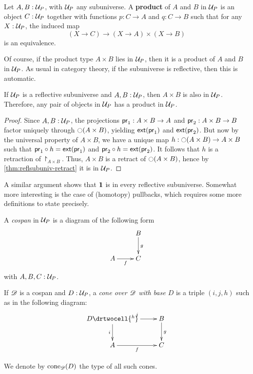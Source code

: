 \begin{defn}
  Let $A,B:\P$, with $\P$ any subuniverse.
  A \textbf{product} of $A$ and $B$ in $\P$ is an object $C:\P$ together with functions $p:C\to A$ and $q:C\to B$ such that for any $X:\P$,
the induced map
  \[ (X\to C) \to (X\to A)\times (X\to B) \]
  is an equivalence.
\end{defn}

Of course, if the product type $A\times B$ lies in $\P$, then it is a product of $A$ and $B$ in $\P$.
As usual in category theory, if the subuniverse is reflective, then this is automatic.

\begin{thm}\label{thm:reflsubuniv-prod}
  If $\P$ is a reflective subuniverse and $A,B:\P$, then $A\times B$ is also in $\P$.
  Therefore, any pair of objects in $\P$ has a product in $\P$.
\end{thm}
\begin{proof}
  Since $A,B:\P$, the projections $\proj1:A\times B\to A$ and $\proj2:A\times B\to B$ factor uniquely through $\reflect(A\times B)$,
yielding $\ext(\proj1)$ and $\ext(\proj2)$.
  But now by the universal property of $A\times B$, we have a unique map $h:\reflect(A\times B) \to A\times B$ such that $\proj1 \circ h =
\ext(\proj1)$ and $\proj2\circ h = \ext(\proj2)$.
  It follows that $h$ is a retraction of $\project_{A\times B}$.
  Thus, $A\times B$ is a retract of $\reflect(A\times B)$, hence by \autoref{thm:reflsubuniv-retract} it is in $\P$.
\end{proof}

A similar argument shows that $\unit$ is in every reflective subuniverse.
Somewhat more interesting is the case of (homotopy) pullbacks, which requires some more definitions to state precisely.

\begin{defn}
  A \emph{cospan} in $\P$ is a diagram of the following form
  \[\xymatrix{& B \ar^g[d] \\ A \ar_f[r] & C}\]
  with $A,B,C:\P$.
\end{defn}

\begin{defn}
  If $\Ddiag$ is a cospan and $D:\P$, a \emph{cone over $\Ddiag$ with
    base $D$} is a triple $(i,j,h)$ such as in the following diagram:
  \[\uppercurveobject{{ }}\lowercurveobject{{ }}\twocellhead{{ }}
  \xymatrix{D \ar^j[r] \ar_i[d] \drtwocell{^h} & B \ar^g[d] \\
    A \ar_f[r] & C
  }\]

  We denote by $\cone{\Ddiag}{D}$ the type of all such cones.
\end{defn}

